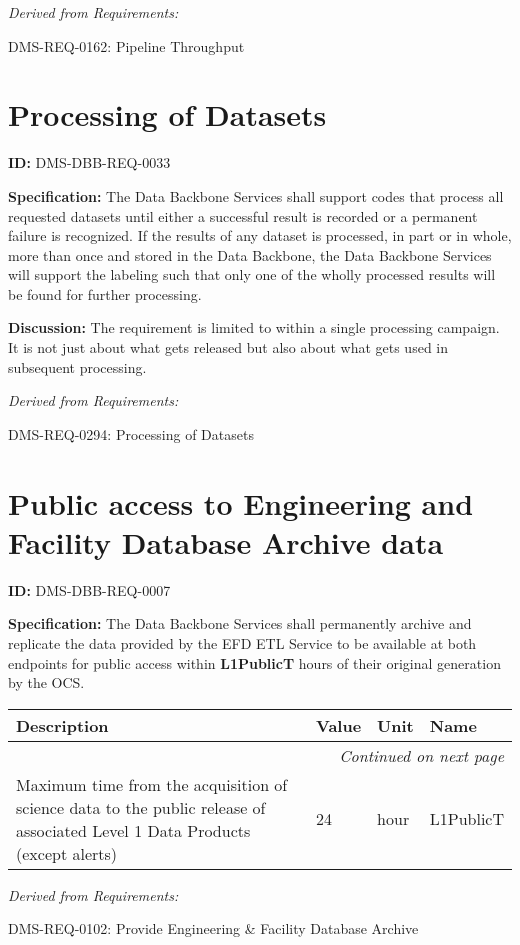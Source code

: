 \documentclass[SE,toc,lsstdraft]{lsstdoc}
\makeatletter
\newcommand{\paramname}[1]{\hspace{0pt}#1}
\newcommand{\unitname}[1]{\hspace{0pt}#1}
\newenvironment{parameters}[0]{%
\setlength\LTleft{0pt}
\setlength\LTright{\fill}
\begin{small}
\begin{longtable}[]{|p{0.49\textwidth}|l|p{0.6in}|p{1.70in}@{}|}

\hline \textbf{Description} & \textbf{Value} & \textbf{Unit} & \textbf{Name} \\ \hline
\endhead

\hline \multicolumn{4}{r}{\emph{Continued on next page}} \\
\endfoot

\hline\hline
\endlastfoot
}{%
\hline
\end{longtable}
\end{small}
}
\makeatother
\begin{document}
\emph{Derived from Requirements:}

DMS-REQ-0162:
Pipeline Throughput \newline

\section{Processing of Datasets}

\label{DMS-DBB-REQ-0033}
\textbf{ID:} DMS-DBB-REQ-0033

\textbf{Specification:}
The Data Backbone Services shall support codes that process all requested datasets until either a successful result is recorded or a permanent failure is recognized. If the results of any dataset is processed, in part or in whole, more than once and stored in the Data Backbone, the Data Backbone Services will support the labeling such that only one of the wholly processed results will be found for further processing.

\textbf{Discussion:}
The requirement is limited to within a single processing campaign.   It is not just about what gets released but also about what gets used in subsequent processing.

\emph{Derived from Requirements:}

DMS-REQ-0294:
Processing of Datasets \newline

\section{Public access to Engineering and Facility Database Archive data}

\label{DMS-DBB-REQ-0007}
\textbf{ID:} DMS-DBB-REQ-0007

\textbf{Specification:}
The Data Backbone Services shall permanently archive and replicate the data provided by the EFD ETL Service to be available at both endpoints for public access within \textbf{L1PublicT} hours of their original generation by the OCS.

\begin{parameters}
Maximum time from the acquisition of science data to the public release of associated Level 1 Data Products (except alerts)
&
24
&
\unitname{%
hour
}
&
\paramname{%
L1PublicT
} \\\hline
\end{parameters}

\emph{Derived from Requirements:}

DMS-REQ-0102:
Provide Engineering \& Facility Database Archive \newline
\end{document}
